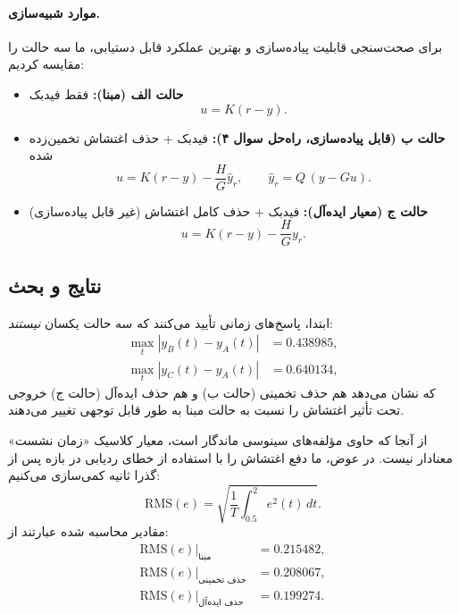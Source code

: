 \documentclass[a4paper]{article}
\begin{document}
\paragraph{موارد شبیه‌سازی.}
برای صحت‌سنجی قابلیت پیاده‌سازی و بهترین عملکرد قابل دستیابی، ما سه حالت را مقایسه کردیم:

\begin{itemize}
	\item \textbf{حالت الف (مبنا):} فقط فیدبک
	\[
	u=K(r-y).
	\]
	\item \textbf{حالت ب (قابل پیاده‌سازی، راه‌حل سوال ۴):} فیدبک + حذف اغتشاش تخمین‌زده شده
	\[
	u=K(r-y)-\frac{H}{G}\hat y_r,\qquad \hat y_r=Q\,(y-Gu).
	\]
	\item \textbf{حالت ج (معیار ایده‌آل):} فیدبک + حذف کامل اغتشاش (غیر قابل پیاده‌سازی)
	\[
	u=K(r-y)-\frac{H}{G}y_r.
	\]
\end{itemize}

\subsection{نتایج و بحث}
ابتدا، پاسخ‌های زمانی تأیید می‌کنند که سه حالت یکسان \emph{نیستند}:
\begin{align}
	\max_t |y_B(t)-y_A(t)| &= 0.438985,\\
	\max_t |y_C(t)-y_A(t)| &= 0.640134,
\end{align}
که نشان می‌دهد هم حذف تخمینی (حالت ب) و هم حذف ایده‌آل (حالت ج) خروجی تحت تأثیر اغتشاش را نسبت به حالت مبنا به طور قابل توجهی تغییر می‌دهند.

از آنجا که  حاوی مؤلفه‌های سینوسی ماندگار است، معیار کلاسیک «زمان نشست» معنادار نیست.
در عوض، ما دفع اغتشاش را با استفاده از خطای ردیابی  در بازه پس از گذرا  ثانیه کمی‌سازی می‌کنیم:
\begin{equation}
	\mathrm{RMS}(e)=\sqrt{\frac{1}{T}\int_{0.5}^{2} e^2(t)\,dt}.
\end{equation}
مقادیر محاسبه شده عبارتند از:
\begin{align}
	\mathrm{RMS}(e)\big|_{\text{مبنا}} &= 0.215482,\\
	\mathrm{RMS}(e)\big|_{\text{حذف تخمینی}} &= 0.208067,\\
	\mathrm{RMS}(e)\big|_{\text{حذف ایده‌آل}} &= 0.199274.
\end{align}
\end{document}
